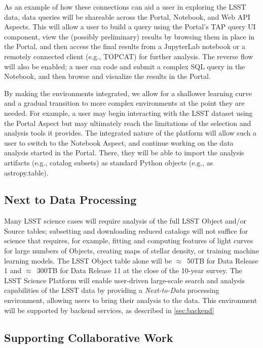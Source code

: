 As an example of how these connections can aid a user in exploring the LSST data, data queries will be shareable across the Portal, Notebook, and Web API Aspects.
This will allow a user to build a query using the Portal's TAP query UI component, view the (possibly preliminary) results by browsing them in place in the Portal, and then access the final results from a JupyterLab notebook or a remotely connected client (e.g., TOPCAT) for further analysis.
The reverse flow will also be enabled; a user can code and submit a complex SQL query in the Notebook, and then browse and visualize the results in the Portal.

By making the environments integrated, we allow for a shallower learning curve and a gradual transition to more complex environments at the point they are needed.
For example, a user may begin interacting with the LSST dataset using the Portal Aspect but may ultimately reach the limitations of the selection and analysis tools it provides.
The integrated nature of the platform will allow such a user to switch to the Notebook Aspect, and continue working on the data analysis started in the Portal.
There, they will be able to import the analysis artifacts (e.g., catalog subsets) as standard Python objects (e.g., as astropy.table).

\subsection{Next to Data Processing\label{sec:n2d}}
Many LSST science cases will require analysis of the full LSST Object and/or Source tables; subsetting and downloading reduced catalogs will not suffice for science that requires, for example, fitting and computing features of light curves for large numbers of Objects, creating maps of stellar density, or training machine learning models.
The LSST Object table alone will be $\approx$~50TB for Data Release 1 and $\approx$~300TB for Data Release 11 at the close of the 10-year survey.
The LSST Science Platform will enable user-driven large-scale search and analysis capabilities of the LSST data by providing a \emph{Next-to-Data} processing environment, allowing users to bring their analysis to the data.
This environment will be supported by backend services, as described in \ref{sec:backend}

\subsection{Supporting Collaborative Work\label{sec:collab}}

